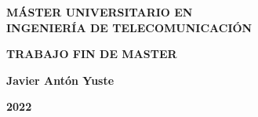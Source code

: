 \pagestyle{empty}

\vspace*{5.5cm}

\begin{center}

{\Large\rm \textbf{ MÁSTER UNIVERSITARIO EN\\
INGENIERÍA DE TELECOMUNICACIÓN\\}}

\vspace{1.0cm}

{\Large\rm \textbf{TRABAJO FIN DE MASTER}}

\vspace{2cm}

{\Large\rm\textbf{\tfgtitleen}}

\vspace*{\fill}

{\Large\rm\textbf{Javier Antón Yuste}}

{\Large \textbf{2022}}
\vspace{1.0cm}
\end{center}

